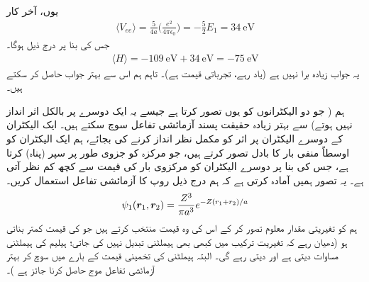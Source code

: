  یوں، آخر کار
\begin{align}\label{مساوات_تغیریتی_مخفیہ_توقعاتی_قیمت}
\langle V_{ee} \rangle=\frac{5}{4a}\big(\frac{e^{2}}{4\pi\epsilon_{0}}\big)=-\frac{5}{2}E_{1}=\SI{34}{\electronvolt} 
\end{align}
 جس کی بنا پر درج ذیل ہوگا۔
\begin{align}
\langle H \rangle =\SI{-109}{\electronvolt}+\SI{34}{\electronvolt}=\SI{-75}{\electronvolt} 
\end{align}
یہ جواب زیادہ برا نہیں ہے (یاد رہے، تجرباتی قیمت  ہے)۔ تاہم ہم اس سے بہتر جواب حاصل کر سکتے ہیں۔

ہم ( جو دو الیکٹرانوں کو یوں تصور کرتا ہے جیسے یہ ایک دوسرے پر بالکل اثر انداز نہیں ہوتے) سے بہتر زیادہ حقیقت پسند آزمائشی تفاعل سوچ سکتے ہیں۔ ایک الیکٹران کے دوسرے الیکٹران پر اثر کو مکمل نظر انداز کرنے کی بجائے، ہم ایک الیکٹران کو اوسطاً منفی بار کا بادل تصور کرتے ہیں، جو مرکزہ کو جزوی طور پر سپر (پناہ) کرتا ہے، جس کی بنا پر دوسرے الیکٹران کو  مرکزوی بار  کی قیمت  سے کچھ کم نظر آتی ہے۔ یہ تصور ہمیں آمادہ کرتی ہے کہ ہم درج ذیل روپ کا آزمائشی تفاعل استعمال کریں۔
\begin{align}\label{مساوات_تغیریت_آزمائشی_سپر}
\psi_{1}({{\boldsymbol{r}}}_{1},{{\boldsymbol{r}}}_{2})=\frac{Z^{3}}{\pi a^{3}}e^{-Z(r_{1}+r_{2})/a} 
\end{align}
 ہم  کو تغیریتی مقدار معلوم تصور کر کے اس کی وہ قیمت منتخب کرتے ہیں جو  کی قیمت کمتر بناتی ہو (دھیان رہے کہ تغیریت ترکیب میں کبھی بھی ہیملٹنی تبدیل نہیں کی جاتی؛ ہیلیم کی ہیملٹنی مساوات  دیتی ہے اور دیتی رہے گی۔ البتہ ہیملٹنی کی تخمینی قیمت کے بارے میں سوچ کر بہتر آزمائشی تفاعل موج حاصل کرنا جائز ہے )۔
 
